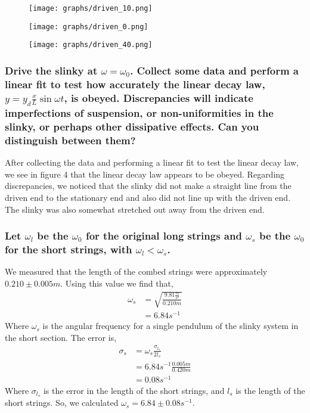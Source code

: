 \documentclass{article}
\begin{document}
\begin{figure}[hp!]
    \centering
    \texttt{[image: graphs/driven\_10.png]}
    \caption{}
    \centering
    \texttt{[image: graphs/driven\_0.png]}
    \caption{}
    \centering
    \texttt{[image: graphs/driven\_40.png]}
    \caption{}
\end{figure}
\newpage
\subsubsection*{Drive the slinky at $\omega=\omega_{0}$.  Collect  some  data  and 
perform a linear fit to test how accurately the linear decay law, 
$y=y_{d}\frac{x}{L}\sin{\omega t}$, is obeyed.  Discrepancies will indicate 
imperfections of suspension, or non-uniformities in the slinky, or perhaps other 
dissipative effects.  Can you distinguish between them?}
After collecting the data and performing a linear fit to test the linear decay law, 
we see in figure 4 that the linear decay law appears to be obeyed.
Regarding discrepancies, we noticed that the slinky did not make a straight line
from the driven end to the stationary end and also did not line up with the 
driven end.  The slinky was also somewhat stretched out away from the driven end.

\subsubsection*{Let $\omega_{l}$ be the $\omega_{0}$ for the original long 
strings and $\omega_{s}$ be the $\omega_{0}$ for the short strings, with 
$\omega_{l}<\omega_{s}$.}
We measured that the length of the combed strings were approximately 
$0.210\pm0.005m$.  Using this value we find that, 
\begin{align*}
    \omega_{s}&=\sqrt{\frac{9.81\frac{m}{s^2}}{0.210m}}\\
    &=6.84s^{-1}
\end{align*}
Where $\omega_{s}$ is the angular frequency for a single pendulum of the slinky
system in the short section.  The error is,
\begin{align*}
    \sigma_{s}&=\omega_{s}\frac{\sigma_{l_{s}}}{2l_{s}}\\
    &=6.84s^{-1}\frac{0.005m}{0.420m}\\
    &=0.08s^{-1}
\end{align*}
Where $\sigma_{l_{s}}$ is the error in the length of the short strings, and 
$l_{s}$ is the length of the short strings.  So, we calculated 
$\omega_{s}=6.84\pm0.08s^{-1}$.
\end{document}
